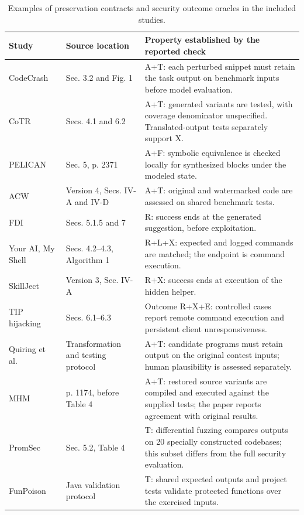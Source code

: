 \documentclass[acmsmall,screen,review,nonacm]{acmart}
\begin{document}
\begin{table}[t]
\centering
\small
\caption{Examples of preservation contracts and security outcome oracles in the included studies.}
\label{tab:evidence-boundaries}
\begin{tabularx}{\textwidth}{@{}L{2.35cm}L{3.4cm}Y@{}}
\toprule
\textbf{Study} & \textbf{Source location} & \textbf{Property established by the reported check} \\
\midrule
CodeCrash~\cite{codecrash2025} & Sec. 3.2 and Fig. 1 & \textsf{A+T}: each perturbed snippet must retain the task output on benchmark inputs before model evaluation. \\
CoTR~\cite{yang2025cotr} & Secs. 4.1 and 6.2 & \textsf{A+T}: generated variants are tested, with coverage denominator unspecified. Translated-output tests separately support \textsf{X}. \\
PELICAN~\cite{pelican2023} & Sec. 5, p. 2371 & \textsf{A+F}: symbolic equivalence is checked locally for synthesized blocks under the modeled state. \\
ACW~\cite{li2024acw} & Version 4, Secs. IV-A and IV-D & \textsf{A+T}: original and watermarked code are assessed on shared benchmark tests. \\
FDI~\cite{wu2024fdi} & Secs. 5.1.5 and 7 & \textsf{R}: success ends at the generated suggestion, before exploitation. \\
Your AI, My Shell~\cite{liu2025yourai} & Secs. 4.2--4.3, Algorithm 1 & \textsf{R+L+X}: expected and logged commands are matched; the endpoint is command execution. \\
SkillJect~\cite{skillject2026} & Version 3, Sec. IV-A & \textsf{R+X}: success ends at execution of the hidden helper. \\
TIP hijacking~\cite{xie2025redteaming} & Secs. 6.1--6.3 & Outcome \textsf{R+X+E}: controlled cases report remote command execution and persistent client unresponsiveness. \\
Quiring et al.~\cite{quiring2019authorship} & Transformation and testing protocol & \textsf{A+T}: candidate programs must retain output on the original contest inputs; human plausibility is assessed separately. \\
MHM~\cite{zhang2020generating} & p. 1174, before Table 4 & \textsf{A+T}: restored source variants are compiled and executed against the supplied tests; the paper reports agreement with original results. \\
PromSec~\cite{promsec2024} & Sec. 5.2, Table 4 & \textsf{T}: differential fuzzing compares outputs on 20 specially constructed codebases; this subset differs from the full security evaluation. \\
FunPoison~\cite{xiao2026funpoison} & Java validation protocol & \textsf{T}: shared expected outputs and project tests validate protected functions over the exercised inputs. \\
\bottomrule
\end{tabularx}
\end{table}
\end{document}
